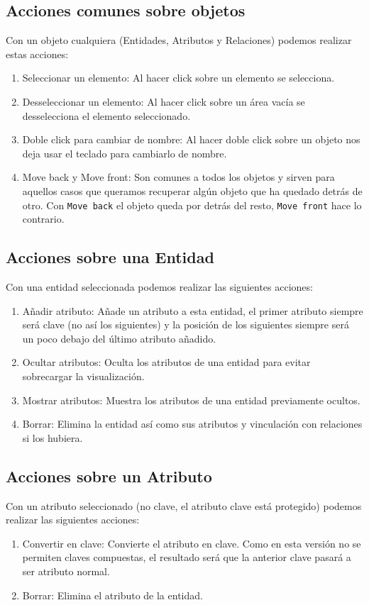 \subsection{Acciones comunes sobre objetos}
Con un objeto cualquiera (Entidades, Atributos y Relaciones) podemos realizar estas acciones:
\begin{enumerate}
    \item Seleccionar un elemento: Al hacer click  sobre un elemento se selecciona.
    \item Desseleccionar un elemento: Al hacer click sobre un área vacía se desselecciona el elemento seleccionado.
    \item Doble click para cambiar de nombre: Al hacer doble click sobre un objeto nos deja usar el teclado para cambiarlo de nombre.
    \item Move back y Move front: Son comunes a todos los objetos y sirven para aquellos casos que queramos recuperar algún objeto que ha quedado detrás de otro. Con \texttt{Move back} el objeto queda por detrás del resto, \texttt{Move front} hace lo contrario.
\end{enumerate}

\subsection{Acciones sobre una Entidad}
Con una entidad seleccionada podemos realizar las siguientes acciones:
\begin{enumerate}
    \item Añadir atributo: Añade un atributo a esta entidad, el primer atributo siempre será clave (no así los siguientes) y la posición de los siguientes siempre será un poco debajo del último atributo añadido.
    \item Ocultar atributos: Oculta los atributos de una entidad para evitar sobrecargar la visualización.
    \item Mostrar atributos: Muestra los atributos de una entidad previamente ocultos.
    \item Borrar: Elimina la entidad así como sus atributos y vinculación con relaciones si los hubiera.
\end{enumerate}


\subsection{Acciones sobre un Atributo}
Con un atributo seleccionado (no clave, el atributo clave está protegido) podemos realizar las siguientes acciones:
\begin{enumerate}
    \item Convertir en clave: Convierte el atributo en clave. Como en esta versión no se permiten claves compuestas, el resultado será que la anterior clave pasará a ser atributo normal.
    \item Borrar: Elimina el atributo de la entidad.
\end{enumerate}

